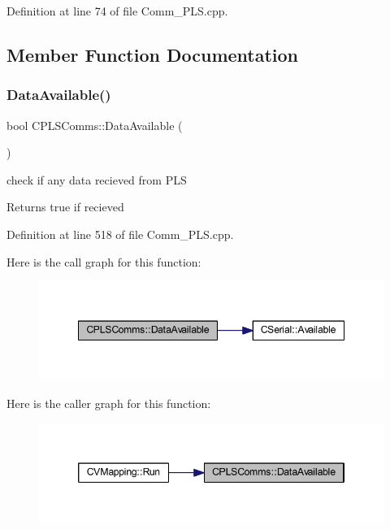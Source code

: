Definition at line 74 of file Comm\+\_\+\+P\+L\+S.\+cpp.



\subsection{Member Function Documentation}
\mbox{\label{class_c_p_l_s_comms_ae9d000eff184034954829d76162654a5}} 
\subsubsection{\texorpdfstring{DataAvailable()}{DataAvailable()}}
{\footnotesize\ttfamily bool C\+P\+L\+S\+Comms\+::\+Data\+Available (\begin{DoxyParamCaption}{ }\end{DoxyParamCaption})}



check if any data recieved from P\+LS 

\begin{DoxyReturn}{Returns}
true if recieved 
\end{DoxyReturn}


Definition at line 518 of file Comm\+\_\+\+P\+L\+S.\+cpp.

Here is the call graph for this function\+:
\nopagebreak
\begin{figure}[H]
\begin{center}
\leavevmode
\includegraphics[width=348pt]{class_c_p_l_s_comms_ae9d000eff184034954829d76162654a5_cgraph}
\end{center}
\end{figure}
Here is the caller graph for this function\+:
\nopagebreak
\begin{figure}[H]
\begin{center}
\leavevmode
\includegraphics[width=346pt]{class_c_p_l_s_comms_ae9d000eff184034954829d76162654a5_icgraph}
\end{center}
\end{figure}
\mbox{\label{class_c_p_l_s_comms_a3124eaa4549706962c7024c7c97e82b0}} 
